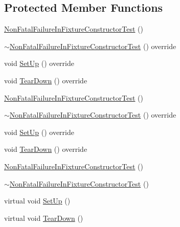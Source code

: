 \subsection*{Protected Member Functions}
\begin{DoxyCompactItemize}
\item 
\mbox{\hyperlink{class_non_fatal_failure_in_fixture_constructor_test_a87a70e2b18b981c627c43f2af85a9345}{Non\+Fatal\+Failure\+In\+Fixture\+Constructor\+Test}} ()
\item 
\mbox{\hyperlink{class_non_fatal_failure_in_fixture_constructor_test_a6fae6ee5a0fc55a74d2c7bd2d710bac7}{$\sim$\+Non\+Fatal\+Failure\+In\+Fixture\+Constructor\+Test}} () override
\item 
void \mbox{\hyperlink{class_non_fatal_failure_in_fixture_constructor_test_aeb0eb1eec27c6732712947713ce24a0e}{Set\+Up}} () override
\item 
void \mbox{\hyperlink{class_non_fatal_failure_in_fixture_constructor_test_ad5d87bdc012dc66c008e7891008eb6a8}{Tear\+Down}} () override
\item 
\mbox{\hyperlink{class_non_fatal_failure_in_fixture_constructor_test_a87a70e2b18b981c627c43f2af85a9345}{Non\+Fatal\+Failure\+In\+Fixture\+Constructor\+Test}} ()
\item 
\mbox{\hyperlink{class_non_fatal_failure_in_fixture_constructor_test_a6fae6ee5a0fc55a74d2c7bd2d710bac7}{$\sim$\+Non\+Fatal\+Failure\+In\+Fixture\+Constructor\+Test}} () override
\item 
void \mbox{\hyperlink{class_non_fatal_failure_in_fixture_constructor_test_aeb0eb1eec27c6732712947713ce24a0e}{Set\+Up}} () override
\item 
void \mbox{\hyperlink{class_non_fatal_failure_in_fixture_constructor_test_ad5d87bdc012dc66c008e7891008eb6a8}{Tear\+Down}} () override
\item 
\mbox{\hyperlink{class_non_fatal_failure_in_fixture_constructor_test_a87a70e2b18b981c627c43f2af85a9345}{Non\+Fatal\+Failure\+In\+Fixture\+Constructor\+Test}} ()
\item 
\mbox{\hyperlink{class_non_fatal_failure_in_fixture_constructor_test_a732fa961c4bb68b3390e4a49a8375619}{$\sim$\+Non\+Fatal\+Failure\+In\+Fixture\+Constructor\+Test}} ()
\item 
virtual void \mbox{\hyperlink{class_non_fatal_failure_in_fixture_constructor_test_a7d951f8fbf7b2ac5046be8d8ee7b03d3}{Set\+Up}} ()
\item 
virtual void \mbox{\hyperlink{class_non_fatal_failure_in_fixture_constructor_test_ab76d79c346d9a378d625fde5739e8ad6}{Tear\+Down}} ()
\end{DoxyCompactItemize}
